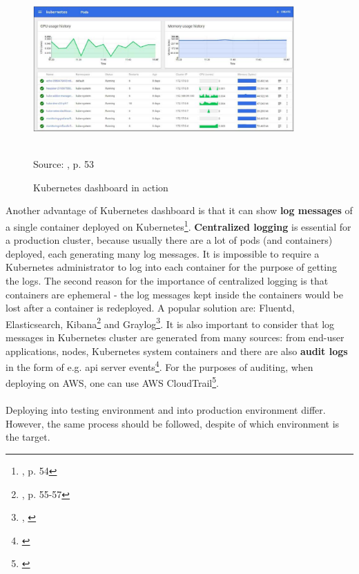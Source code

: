 \begin{figure}[H]
  \centering
  \includegraphics[width=10cm]{figures/k8s-dashboard.png}
  \label{fig:grafana}
  \caption{Kubernetes dashboard in action}
  \\
  \tiny{Source: \cite{book-mastering-k8s}, p. 53}
\end{figure}

Another advantage of Kubernetes dashboard is that it can show \textbf{log messages} of a single container deployed on Kubernetes\footnote{\cite{book-mastering-k8s}, p. 54}. \textbf{Centralized logging} is essential for a production cluster, because usually there are a lot of pods (and containers) deployed, each generating many log messages. It is impossible to require a Kubernetes administrator to log into each container for the purpose of getting the logs. The second reason for the importance of centralized logging is that containers are ephemeral - the log messages kept inside the containers would be lost after a container is redeployed. A popular solution are: Fluentd, Elasticsearch, Kibana\footnote{\cite{book-mastering-k8s}, p. 55-57} and Graylog\footnote{\cite{online-prod-year-k8s}, \cite{online-graylog}}. It is also important to consider that log messages in Kubernetes cluster are generated from many sources: from end-user applications, nodes, Kubernetes system containers and there are also \textbf{audit logs} in the form of e.g. api server events\footnote{\cite{online-graylog-art}}. For the purposes of auditing, when deploying on AWS, one can use AWS CloudTrail\footnote{\cite{online-ct}}.

\paragraph{}
Deploying into testing environment and into production environment differ. However, the same process should be followed, despite of which environment is the target.

